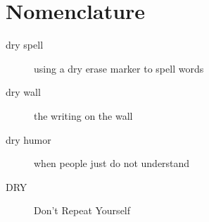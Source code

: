 \documentclass[relax,pdf,12pt,article]{SANDreport}
\renewcommand{\headrulewidth}{1.0pt}
\begin{document}
    \clearpage
    \section*{Nomenclature}
    \begin{description}
	\item[dry spell]
	    using a dry erase marker to spell words
	\item[dry wall]
	    the writing on the wall
	\item[dry humor]
	    when people just do not understand
	\item[DRY]
	    Don't Repeat Yourself
    \end{description}
    \fi


    \SANDmain		%

	



    \clearpage
    \providecommand*{\phantomsection}{}
    \phantomsection
    
    


    \begin{SANDdistribution}[NM]%




    \end{SANDdistribution}
\end{document}
